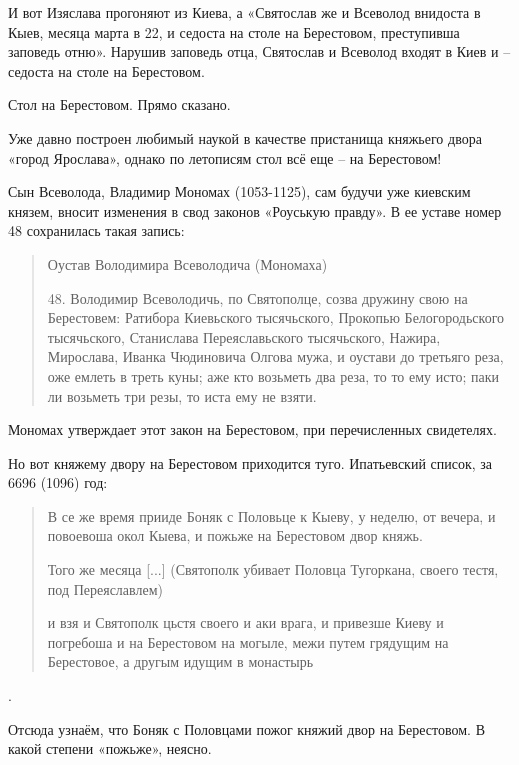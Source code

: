 И вот Изяслава прогоняют из Киева, а «Святослав же и Всеволод внидоста в Кыев, месяца марта в 22, и седоста на столе на Берестовом, преступивша заповедь отню». Нарушив заповедь отца, Святослав и Всеволод входят в Киев и – седоста на столе на Берестовом.

Стол на Берестовом. Прямо сказано.

Уже давно построен любимый наукой в качестве пристанища княжьего двора «город Ярослава», однако по летописям стол всё еще – на Берестовом!

Сын Всеволода, Владимир Мономах (1053-1125), сам будучи уже киевским князем, вносит изменения в свод законов «Роуськую правду». В ее уставе номер 48 сохранилась такая запись:

\begin{quotation}
Оустав Володимира Всеволодича (Мономаха)

48. Володимир Всеволодичь, по Святополце, созва дружину свою на Берестовем: Ратибора Киевьского тысячьского, Прокопью Белогородьского тысячьского, Станислава Переяславьского тысячьского, Нажира, Мирослава, Иванка Чюдиновича Олгова мужа, и оустави до третьяго реза, оже емлеть в треть куны; аже кто возьметь два реза, то то ему исто; паки ли возьметь три резы, то иста ему не взяти.
\end{quotation}

Мономах утверждает этот закон на Берестовом, при перечисленных свидетелях.


Но вот княжему двору на Берестовом приходится туго. Ипатьевский список, за 6696 (1096) год:

\begin{quotation}
В се же время прииде Боняк с Половьце к Кыеву, у неделю, от вечера, и повоевоша окол Кыева, и пожьже на Берестовом двор княжь.

Того же месяца [...] (Святополк убивает Половца Тугоркана, своего тестя, под Переяславлем)

и взя и Святополк цьстя своего и аки врага, и привезше Киеву и погребоша и на Берестовом на могыле, межи путем грядущим на Берестовое, а другым идущим в монастырь
\end{quotation}.

Отсюда узнаём, что Боняк с Половцами пожог княжий двор на Берестовом. В какой степени «пожьже», неясно. 

